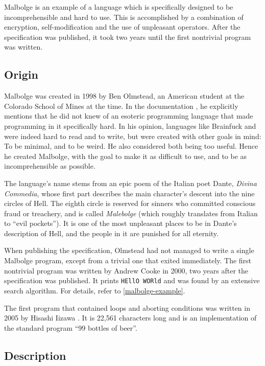 Malbolge is an example of a language which is specifically designed to be incomprehensible and hard to use. This is accomplished by a combination of encryption, self-modification and the use of unpleasant operators. After the specification was published, it took two years until the first nontrivial program was written.

\subsection{Origin}

Malbolge was created in 1998 by Ben Olmstead, an American student at the Colorado School of Mines at the time. In the documentation \cite{olmstead1998malbolge}, he explicitly mentions that he did not knew of an esoteric programming language that made programming in it specifically hard. In his opinion, languages like Brainfuck and \ic{} were indeed hard to read and to write, but were created with other goals in mind: To be minimal, and to be weird. He also considered both being too useful. Hence he created Malbolge, with the goal to make it as difficult to use, and to be as incomprehensible as possible.

The language's name stems from an epic poem of the Italian poet Dante, \emph{Divina Commedia}, whose first part describes the main character's descent into the nine circles of Hell. The eighth circle is reserved for sinners who committed conscious fraud or treachery, and is called \emph{Malebolge} (which roughly translates from Italian to “evil pockets”). It is one of the most unpleasant places to be in Dante's description of Hell, and the people in it are punished for all eternity.

When publishing the specification, Olmstead had not managed to write a single Malbolge program, except from a trivial one that exited immediately. The first nontrivial program was written by Andrew Cooke in 2000, two years after the specification was published. It prints \texttt{HEllO WORld} \cite{cooke2000malbolge} and was found by an extensive search algorithm. For details, refer to \cref{malbolge-example}.

The first program that contained loops and aborting conditions was written in 2005 by Hisashi Iizawa \cite{iizawa2005malbolge}. It is 22,561 characters long and is an implementation of the standard program “99 bottles of beer”.

\subsection{Description}

